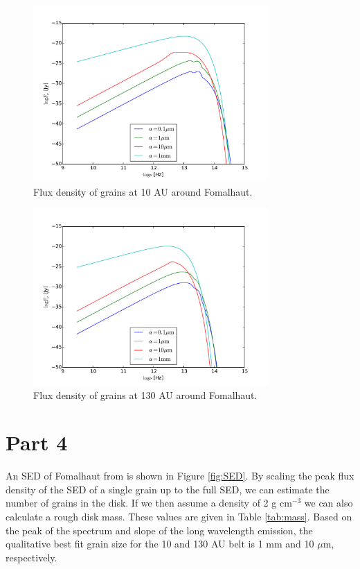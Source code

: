 \documentclass[12pt,preprint]{aastex}
\begin{document}

\begin{figure}[htbp]
\begin{center}
\includegraphics[width=0.8\textwidth]{Fnu10AU.pdf}
    \caption{Flux density of grains at 10 AU around Fomalhaut.}
    \label{fig:Fnu10AU}
\end{center}
\end{figure}

\begin{figure}[htbp]
\begin{center}
\includegraphics[width=0.8\textwidth]{Fnu130AU.pdf}
    \caption{Flux density of grains at 130 AU around Fomalhaut.}
    \label{fig:Fnu130AU}
\end{center}
\end{figure}

\section{Part 4}
An SED of Fomalhaut from \citet{SED} is shown in Figure \ref{fig:SED}. By scaling the peak flux density of the SED of a single grain up to the full SED, we can estimate the number of grains in the disk. If we then assume a density of 2 g cm$^{-3}$ we can also calculate a rough disk mass. These values are given in Table \ref{tab:mass}. Based on the peak of the spectrum and slope of the long wavelength emission, the qualitative best fit grain size for the 10 and 130 AU belt is 1 mm and 10 $\mu$m, respectively.
\end{document}
